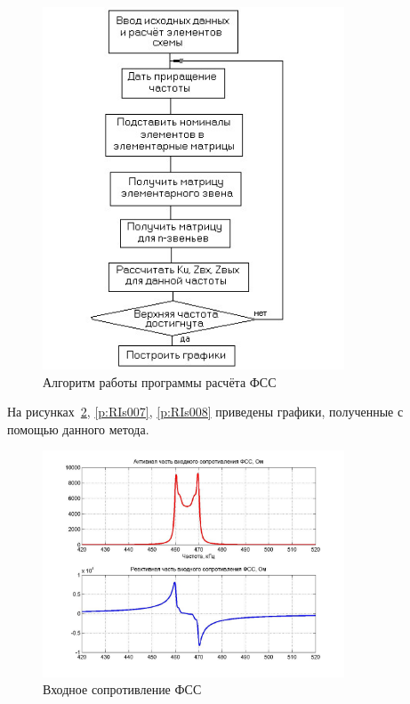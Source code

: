 \begin{figure}[H] \centering
  \includegraphics[width=0.8\textwidth]{./content/RIs005.jpg}
  \caption{Алгоритм работы программы расчёта ФСС} \label{p:RIs005}
\end{figure}








На  рисунках~\ref{p:RIs006}, \ref{p:RIs007}, \ref{p:RIs008}  приведены  графики,  полученные  с  помощью данного метода.


\begin{figure}[H] \centering
  \includegraphics[width=0.8\textwidth]{./content/RIs006.jpg}
  \caption{Входное сопротивление ФСС} \label{p:RIs006}
\end{figure}


